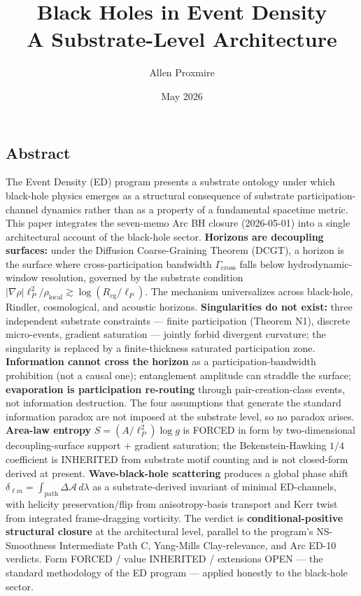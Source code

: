 \documentclass[
  11pt,
  a4paper,
]{article}
\title{Black Holes in Event Density\\
\large A Substrate-Level Architecture}
\author{Allen Proxmire}
\date{May 2026}
\begin{document}
\maketitle

\subsection{Abstract}\label{abstract}

The Event Density (ED) program presents a substrate ontology under which
black-hole physics emerges as a structural consequence of substrate
participation-channel dynamics rather than as a property of a
fundamental spacetime metric. This paper integrates the seven-memo Arc
BH closure (2026-05-01) into a single architectural account of the
black-hole sector. \textbf{Horizons are decoupling surfaces:} under the
Diffusion Coarse-Graining Theorem (DCGT), a horizon is the surface where
cross-participation bandwidth \(\Gamma_\mathrm{cross}\) falls below
hydrodynamic-window resolution, governed by the substrate condition
\(|\nabla\rho|\ell_P^2/\rho_\mathrm{local} \gtrsim \log(R_\mathrm{cg}/\ell_P)\).
The mechanism universalizes across black-hole, Rindler, cosmological,
and acoustic horizons. \textbf{Singularities do not exist:} three
independent substrate constraints --- finite participation (Theorem N1),
discrete micro-events, gradient saturation --- jointly forbid divergent
curvature; the singularity is replaced by a finite-thickness saturated
participation zone. \textbf{Information cannot cross the horizon} as a
participation-bandwidth prohibition (not a causal one); entanglement
amplitude can straddle the surface; \textbf{evaporation is participation
re-routing} through pair-creation-class events, not information
destruction. The four assumptions that generate the standard information
paradox are not imposed at the substrate level, so no paradox arises.
\textbf{Area-law entropy} \(S = (A/\ell_P^2)\log g\) is FORCED in form
by two-dimensional decoupling-surface support + gradient saturation; the
Bekenstein-Hawking \(1/4\) coefficient is INHERITED from substrate motif
counting and is not closed-form derived at present.
\textbf{Wave-black-hole scattering} produces a global phase shift
\(\delta_{\ell m} = \int_\mathrm{path}\Delta\mathcal{A}\,d\lambda\) as a
substrate-derived invariant of minimal ED-channels, with helicity
preservation/flip from anisotropy-basis transport and Kerr twist from
integrated frame-dragging vorticity. The verdict is
\textbf{conditional-positive structural closure} at the architectural
level, parallel to the program's NS-Smoothness Intermediate Path C,
Yang-Mills Clay-relevance, and Arc ED-10 verdicts. Form FORCED / value
INHERITED / extensions OPEN --- the standard methodology of the ED
program --- applied honestly to the black-hole sector.
\end{document}
